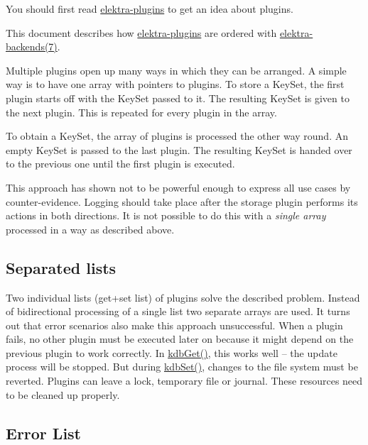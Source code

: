 You should first read \hyperlink{md_src_plugins_README_src_plugins_README_md}{elektra-\/plugins} to get an idea about plugins.

This document describes how \hyperlink{md_src_plugins_README_src_plugins_README_md}{elektra-\/plugins} are ordered with \hyperlink{md_doc_help_elektra-backends_doc_help_elektra-backends_md}{elektra-\/backends(7)}.

Multiple plugins open up many ways in which they can be arranged. A simple way is to have one array with pointers to plugins. To store a {\ttfamily Key\+Set}, the first plugin starts off with the {\ttfamily Key\+Set} passed to it. The resulting {\ttfamily Key\+Set} is given to the next plugin. This is repeated for every plugin in the array.

To obtain a {\ttfamily Key\+Set}, the array of plugins is processed the other way round. An empty {\ttfamily Key\+Set} is passed to the last plugin. The resulting {\ttfamily Key\+Set} is handed over to the previous one until the first plugin is executed.

This approach has shown not to be powerful enough to express all use cases by counter-\/evidence. Logging should take place after the storage plugin performs its actions in both directions. It is not possible to do this with a {\itshape single array} processed in a way as described above.

\subsection*{Separated lists}

Two individual lists (get+set list) of plugins solve the described problem. Instead of bidirectional processing of a single list two separate arrays are used. It turns out that error scenarios also make this approach unsuccessful. When a plugin fails, no other plugin must be executed later on because it might depend on the previous plugin to work correctly. In {\ttfamily \hyperlink{group__kdb_ga28e385fd9cb7ccfe0b2f1ed2f62453a1}{kdb\+Get()}}, this works well -- the update process will be stopped. But during {\ttfamily \hyperlink{group__kdb_ga11436b058408f83d303ca5e996832bcf}{kdb\+Set()}}, changes to the file system must be reverted. Plugins can leave a lock, temporary file or journal. These resources need to be cleaned up properly.

\subsection*{Error List}

